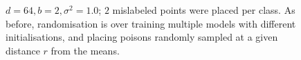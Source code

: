 \documentclass{ociamthesis}
\begin{document}
\begin{figure}[!h]
    \centering
    \qquad
    \caption{$d=64, b=2, \sigma^2=1.0$; $2$ mislabeled points were placed per
    class. As before, randomisation is over training multiple models with
    different initialisations, and placing poisons randomly sampled at a given
    distance $r$ from the means.}
    \label{fig:poison-toy-experiments}
\end{figure}
\end{document}
